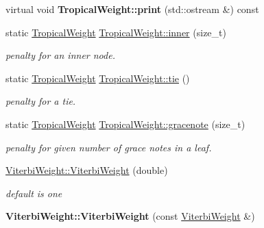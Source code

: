 \begin{DoxyCompactItemize}
\mbox{\label{group__weight_gaa6f92a288b315fed3b301de728f2717d}} 
virtual void {\bfseries Tropical\+Weight\+::print} (std\+::ostream \&) const
\item 
\mbox{\label{group__weight_gace00a414884a9a4824c3cac4b8b084a9}} 
static \mbox{\hyperlink{classTropicalWeight}{Tropical\+Weight}} \mbox{\hyperlink{group__weight_gace00a414884a9a4824c3cac4b8b084a9}{Tropical\+Weight\+::inner}} (size\+\_\+t)
\begin{DoxyCompactList}\small\item\em penalty for an inner node. \end{DoxyCompactList}\item 
\mbox{\label{group__weight_gad8d0422a24b5d4a76856191cc441396c}} 
static \mbox{\hyperlink{classTropicalWeight}{Tropical\+Weight}} \mbox{\hyperlink{group__weight_gad8d0422a24b5d4a76856191cc441396c}{Tropical\+Weight\+::tie}} ()
\begin{DoxyCompactList}\small\item\em penalty for a tie. \end{DoxyCompactList}\item 
static \mbox{\hyperlink{classTropicalWeight}{Tropical\+Weight}} \mbox{\hyperlink{group__weight_ga739a8c09964d0db9552f5924b494c89d}{Tropical\+Weight\+::gracenote}} (size\+\_\+t)
\begin{DoxyCompactList}\small\item\em penalty for given number of grace notes in a leaf. \end{DoxyCompactList}\item 
\mbox{\label{group__weight_gaf4e626612999673b8e4e0a322119402c}} 
\mbox{\hyperlink{group__weight_gaf4e626612999673b8e4e0a322119402c}{Viterbi\+Weight\+::\+Viterbi\+Weight}} (double)
\begin{DoxyCompactList}\small\item\em default is one \end{DoxyCompactList}\item 
\mbox{\label{group__weight_gad7ca8b9082125f4ac2f9f562685517a9}} 
{\bfseries Viterbi\+Weight\+::\+Viterbi\+Weight} (const \mbox{\hyperlink{classViterbiWeight}{Viterbi\+Weight}} \&)
\item 
\mbox{\label{group__weight_ga388bdd81eafaa3cb729934f36f603f35}} 

\end{DoxyCompactItemize}

